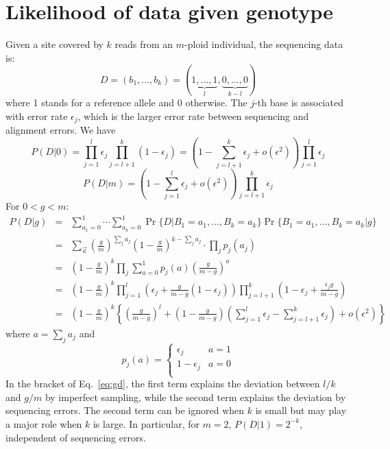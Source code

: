 \documentclass[pdftex,10pt]{book}
\begin{document}
\section{Likelihood of data given genotype}\label{sec:pdg}
Given a site covered by $k$ reads from an $m$-ploid individual, the
sequencing data is:
\[
D=(b_1,\dots,b_k)=(\underbrace{1,\ldots,1}_l,\underbrace{0,\ldots,0}_{k-l})
\]
where 1 stands for a reference allele and 0 otherwise. The $j$-th base
is associated with error rate $\epsilon_j$, which is the larger error
rate between sequencing and alignment errors. We have
\begin{equation}
P(D|0)=\prod_{j=1}^l\epsilon_j\prod_{j=l+1}^k(1-\epsilon_j)=\left(1-\sum_{j=l+1}^k\epsilon_j+o(\epsilon^2)\right)\prod_{j=1}^l\epsilon_j
\end{equation}
\begin{equation}
P(D|m)=\left(1-\sum_{j=1}^l\epsilon_j+o(\epsilon^2)\right)\prod_{j=l+1}^k\epsilon_j
\end{equation}
For $0<g<m$:
\begin{eqnarray}\label{eq:gd}
P(D|g)&=&\sum_{a_1=0}^1\cdots\sum_{a_k=0}^1\Pr\{D|B_1=a_1,\ldots,B_k=a_k\}\Pr\{B_1=a_1,\ldots,B_k=a_k|g\}\\\nonumber
&=&\sum_{\vec{a}}\left(\frac{g}{m}\right)^{\sum_j a_j}\left(1-\frac{g}{m}\right)^{k-\sum_j a_j}\cdot\prod_j p_j(a_j)\\\nonumber
&=&\left(1-\frac{g}{m}\right)^k\prod_j\sum_{a=0}^1 p_j(a)\left(\frac{g}{m-g}\right)^a\\\nonumber
&=&\left(1-\frac{g}{m}\right)^k\prod_{j=1}^l\left(\epsilon_j+\frac{g}{m-g}(1-\epsilon_j)\right)\prod_{j=l+1}^k\left(1-\epsilon_j+\frac{\epsilon_jg}{m-g}\right)\\\nonumber
&=&\left(1-\frac{g}{m}\right)^k\left\{\left(\frac{g}{m-g}\right)^l+\left(1-\frac{g}{m-g}\right)\left(\sum_{j=1}^l\epsilon_j-\sum_{j=l+1}^k\epsilon_j\right)+o(\epsilon^2)\right\}
\end{eqnarray}
where $a=\sum_j a_j$ and
$$
p_j(a)=\left\{\begin{array}{ll}
\epsilon_j & \mbox{$a=1$}\\
1-\epsilon_j & \mbox{$a=0$}\\
\end{array}\right.
$$
In the bracket of Eq.~\ref{eq:gd}, the first term explains the deviation between $l/k$ and
$g/m$ by imperfect sampling, while the second term explains the
deviation by sequencing errors. The second term can be ignored when $k$
is small but may play a major role when $k$ is large. In particular, for
$m=2$, $P(D|1)=2^{-k}$, independent of sequencing errors.
\end{document}
